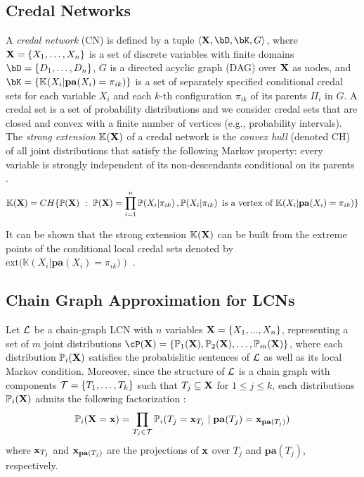 \documentclass{article}
\newcommand{\pr}[1]{\mathbb{P}\!\left( #1 \right)}
\newcommand{\kr}[1]{\mathbb{K}\!\left( #1 \right)}
\begin{document}
\subsection{Credal Networks}
A \emph{credal network} (CN) \citep{cozman2000credal} is defined by a tuple $\langle \bX, \bD, \bK, G \rangle$, where $\mathbf{X}=\{X_1, \ldots, X_n\}$ is a set of discrete variables with finite domains $\bD=\{D_1, \ldots, D_n\}$, $G$ is a directed acyclic graph (DAG) over $\mathbf{X}$ as nodes, and $\bK=\{\kr{X_i|\mathbf{pa}(X_i)=\pi_{ik}}\}$ is a set of separately specified conditional credal sets for each variable $X_i$ and each $k$-th configuration $\pi_{ik}$ of its parents $\Pi_i$ in $G$. A credal set is a set of probability distributions \citep{levi80book} and we consider credal sets that are closed and convex with a finite number of vertices (e.g., probability intervals). The \emph{strong extension} $\kr{\bX}$ of a credal network is the \emph{convex hull} (denoted CH) of all joint distributions that satisfy the following Markov property: every variable is strongly independent of its non-descendants conditional on its parents \cite{cozman2000credal}.
\begin{equation}\label{eq:strong-ext}
    \kr{\bX}=CH\{\pr{\bX}~:~ \pr{\bX}=\prod_{i=1}^{n} \pr{X_i|\pi_{ik}}, \pr{X_i|\pi_{ik}} \textrm{~is a vertex of~} \kr{X_i|\mathbf{pa}(X_i)=\pi_{ik}}\}
\end{equation}

It can be shown that the strong extension $\kr{\bX}$ can be built from the extreme points of the conditional local credal sets denoted by $\textrm{ext}(\kr{X_i|\mathbf{pa}(X_i)=\pi_{ik})}$ \citep{maua2020ijar}. 

\subsection{Chain Graph Approximation for LCNs}
Let $\mathcal{L}$ be a chain-graph LCN with $n$ variables $\mathbf{X} = \{X_1, ..., X_n\}$, representing a set of $m$ joint distributions $\cP(\bX) = \{ \mathbb{P}_1(\bX), \mathbb{P}_2(\bX), \ldots, \mathbb{P}_m(\bX) \}$, where each distribution $\mathbb{P}_i(\mathbf{X})$ satisfies the probabislitic sentences of $\mathcal{L}$ as well as its local Markov condition. Moreover, since the structure of $\mathcal{L}$ is a chain graph with components $\mathcal{T} = \{T_1, \ldots, T_k\}$ such that $T_j \subseteq \mathbf{X}$ for $1\leq j \leq k$, each distributions $\mathbb{P}_i(\mathbf{X})$ admits the following factorization \cite{cozman23a}: 
\begin{equation}
\mathbb{P}_i(\mathbf{X}=\mathbf{x}) = \prod_{T_j \in \mathcal{T}} \mathbb{P}_i(T_j=\mathbf{x}_{T_j}\mid\mathbf{pa}(T_j)=\mathbf{x}_{\mathbf{pa}(T_j)})
\end{equation}
where $\mathbf{x}_{T_j}$ and $\mathbf{x}_{\mathbf{pa}(T_j)}$ are the projections of $\mathbf{x}$ over $T_j$ and $\mathbf{pa}(T_j)$, respectively.
\end{document}
